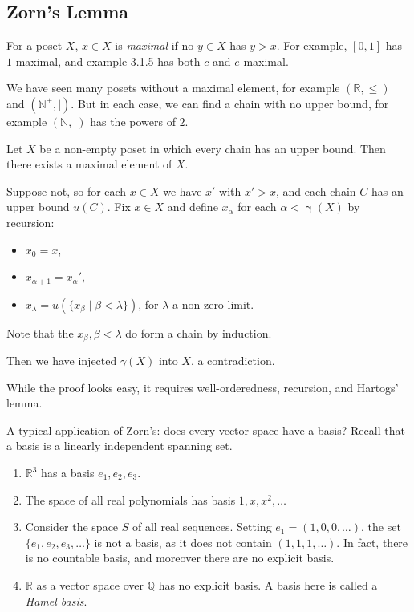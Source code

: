 \documentclass[12pt]{article}
\begin{document}
\subsection{Zorn's Lemma}
\label{sub:zorns_lemma}

For a poset $X$, $x \in X$ is \emph{maximal} if no $y \in X$ has $y > x$. For example, $[0, 1]$ has $1$ maximal, and example 3.1.5 has both $c$ and $e$ maximal.

We have seen many posets without a maximal element, for example $(\mathbb{R}, \leq)$ and $(\mathbb{N}^{+}, \mid)$. But in each case, we can find a chain with no upper bound, for example $(\mathbb{N}, \mid)$ has the powers of $2$.

\begin{theorem}
	Let $X$ be a non-empty poset in which every chain has an upper bound. Then there exists a maximal element of $X$.
\end{theorem}

\begin{proofbox}
	Suppose not, so for each $x \in X$ we have $x'$ with $x' > x$, and each chain $C$ has an upper bound $u(C)$. Fix $x \in X$ and define $x_{\alpha}$ for each $\alpha < \upgamma(X)$ by recursion:
	\begin{itemize}
		\item $x_0 = x$,
		\item $x_{\alpha + 1} = x_{\alpha}'$,
		\item $x_{\lambda} = u(\{x_{\beta} \mid \beta < \lambda\})$, for $\lambda$ a non-zero limit.
	\end{itemize}
	Note that the $x_{\beta}, \beta < \lambda$ do form a chain by induction.

	Then we have injected $\gamma(X)$ into $X$, a contradiction.
\end{proofbox}

\begin{remark}
	While the proof looks easy, it requires well-orderedness, recursion, and Hartogs' lemma.
\end{remark}

A typical application of Zorn's: does every vector space have a basis? Recall that a basis is a linearly independent spanning set.

\begin{exbox}
	\begin{enumerate}
		\item $\mathbb{R}^3$ has a basis $e_1, e_2, e_3$.
		\item The space of all real polynomials has basis $1, x, x^2, \ldots$ 
		\item Consider the space $S$ of all real sequences. Setting $e_1 = (1, 0, 0, \ldots)$, the set $\{e_1, e_2, e_3, \ldots\}$ is not a basis, as it does not contain $(1, 1, 1, \ldots)$. In fact, there is no countable basis, and moreover there are no explicit basis.
		\item $\mathbb{R}$ as a vector space over $\mathbb{Q}$ has no explicit basis. A basis here is called a \emph{Hamel basis}.
	\end{enumerate}
\end{exbox}
\end{document}
